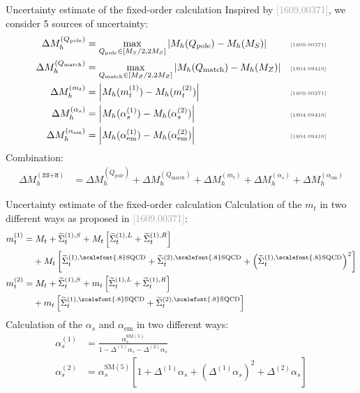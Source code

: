\documentclass[hyperref={pdfpagelabels=false},ngerman]{beamer}
\newcommand{\MS}{\ensuremath{M_S}}
\newcommand{\mycite}[1]{\ensuremath{\text{\textcolor{darkgray}{\tiny [#1]}}}}
\newcommand{\bigcite}[1]{\textcolor{darkgray}{[#1]}}
\newcommand{\SM}{\ensuremath{\text{SM}}}
\newcommand{\as}{\alpha_s}
\newcommand{\aem}{\alpha_\text{em}}
\newcommand{\SQCD}{\ensuremath{\scalefont{.8}\text{SQCD}}}
\newcommand{\Qpole}{\ensuremath{Q_\text{pole}}}
\newcommand{\Qmatch}{\ensuremath{Q_\text{match}}}
\newcommand{\DMh}{\ensuremath{\Delta M_h^{(\texttt{SS+H})}}}
\newcommand{\DMhQpole}{\ensuremath{\Delta M_h^{(\Qpole)}}}
\newcommand{\DMhQmatch}{\ensuremath{\Delta M_h^{(\Qmatch)}}}
\newcommand{\DMhMt}{\ensuremath{\Delta M_h^{(m_t)}}}
\newcommand{\DMhAlphaS}{\ensuremath{\Delta M_h^{(\as)}}}
\newcommand{\DMhAlphaEm}{\ensuremath{\Delta M_h^{(\aem)}}}
\begin{document}
\begin{frame}[noframenumbering]{Uncertainty estimate of the fixed-order calculation}
  Inspired by \bigcite{1609.00371}, we consider 5 sources of
  uncertainty:
  \begin{align*}
    \DMhQpole &= \max_{\Qpole\in[\MS/2,2\MS]}\left|M_h(\Qpole) - M_h(\MS)\right| & \text{\mycite{1609.00371}} \\
    \DMhQmatch &= \max_{\Qmatch\in[M_Z/2,2M_Z]}\left|M_h(\Qmatch) - M_h(M_Z)\right| & \text{\mycite{1804.09410}} \\
    \DMhMt &= \left|M_h(m_t^{(1)}) - M_h(m_t^{(2)})\right| & \text{\mycite{1609.00371}} \\
    \DMhAlphaS &= \left| M_h(\as^{(1)}) - M_h(\as^{(2)}) \right| & \text{\mycite{1804.09410}} \\
    \DMhAlphaEm &= \left| M_h(\aem^{(1)}) - M_h(\aem^{(2)}) \right| & \text{\mycite{1804.09410}}
  \end{align*}
  Combination:
  \begin{align*}
    \DMh &= \DMhQpole + \DMhQmatch + \DMhMt + \DMhAlphaS + \DMhAlphaEm 
  \end{align*}
\end{frame}


\begin{frame}[noframenumbering]{Uncertainty estimate of the fixed-order calculation}
  Calculation of the $m_t$ in two different ways as proposed in
  \bigcite{1609.00371}:
  \begin{align*}
    m_t^{(1)} &=
                M_t + \widetilde{\Sigma}_t^{(1),S} +
                M_t \left[
                \widetilde{\Sigma}_t^{(1),L} +
                \widetilde{\Sigma}_t^{(1),R}
                \right] \\
              &\phantom{={}} + M_t
                \left[\widetilde{\Sigma}_t^{(1),\SQCD}
                + \widetilde{\Sigma}_t^{(2),\SQCD}
                + \left(\widetilde{\Sigma}_t^{(1),\SQCD}\right)^2
                \right]\\
    m_t^{(2)} &=
                M_t + \widetilde{\Sigma}_t^{(1),S} +
                m_t \left[
                \widetilde{\Sigma}_t^{(1),L} +
                \widetilde{\Sigma}_t^{(1),R}
                \right] \nonumber \\
              &\phantom{={}} +
                m_t
                \left[\widetilde{\Sigma}_t^{(1),\SQCD} +
                \widetilde{\Sigma}_t^{(2),\SQCD}
                \right]
  \end{align*}
  Calculation of the $\as$ and $\aem$ in two different ways:
  \begin{align*}
    \as^{(1)}  &= \frac{\as^{\SM(5)}}{1 - \Delta^{(1)}\as - \Delta^{(2)}\as}\\
    \as^{(2)}  &= \as^{\SM(5)} \left[1 + \Delta^{(1)}\as + (\Delta^{(1)}\as)^2 + \Delta^{(2)}\as\right]
  \end{align*}
\end{frame}
\end{document}
